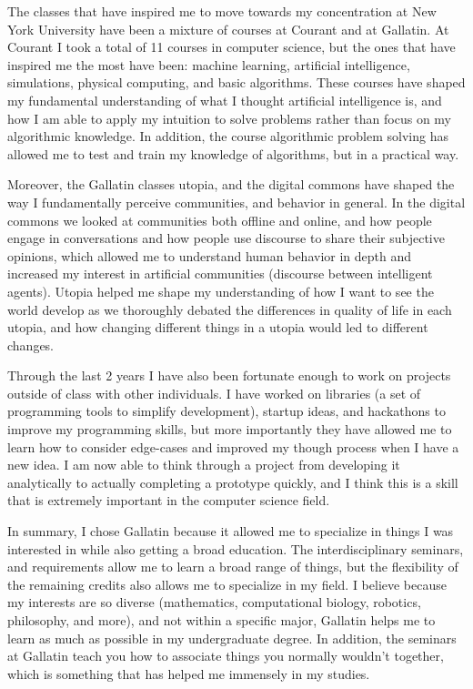 \documentclass[11pt, oneside]{article}
\begin{document}
\par The classes that have inspired me to move towards my concentration at New York University have been a mixture of courses at Courant and at Gallatin. At Courant I took a total of 11 courses in computer science, but the ones that have inspired me the most have been: machine learning, artificial intelligence, simulations, physical computing, and basic algorithms. These courses have shaped my fundamental understanding of what I thought artificial intelligence is, and how I am able to apply my intuition to solve problems rather than focus on my algorithmic knowledge. In addition, the course algorithmic problem solving has allowed me to test and train my knowledge of algorithms, but in a practical way.

\par Moreover, the Gallatin classes utopia, and the digital commons have shaped the way I fundamentally perceive communities, and behavior in general. In the digital commons we looked at communities both offline and online, and how people engage in conversations and how people use discourse to share their subjective opinions, which allowed me to understand human behavior in depth and increased my interest in artificial communities (discourse between intelligent agents). Utopia helped me shape my understanding of how I want to see the world develop as we thoroughly debated the differences in quality of life in each utopia, and how changing different things in a utopia would led to different changes.

\par Through the last 2 years I have also been fortunate enough to work on projects outside of class with other individuals. I have worked on libraries (a set of programming tools to simplify development), startup ideas, and hackathons to improve my programming skills, but more importantly they have allowed me to learn how to consider edge-cases and improved my though process when I have a new idea. I am now able to think through a project from developing it analytically to actually completing a prototype quickly, and I think this is a skill that is extremely important in the computer science field.

\par In summary, I chose Gallatin because it allowed me to specialize in things I was interested in while also getting a broad education. The interdisciplinary seminars, and requirements allow me to learn a broad range of things, but the flexibility of the remaining credits also allows me to specialize in my field. I believe because my interests are so diverse (mathematics, computational biology, robotics, philosophy, and more), and not within a specific major, Gallatin helps me to learn as much as possible in my undergraduate degree. In addition, the seminars at Gallatin teach you how to associate things you normally wouldn't together, which is something that has helped me immensely in my studies.
\end{document}
